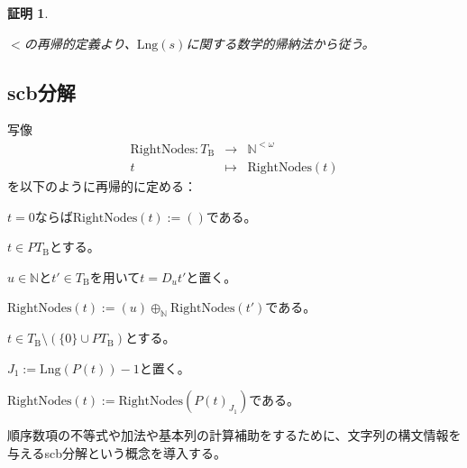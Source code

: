 \documentclass[dvipdfmx,uplatex]{jsarticle}
\theoremstyle{customnonumberbreakfortheorem}
\theoremstyle{customnonumberbreakforproof}
\newtheorem{hideableproof}{証明}
\begin{document}
\begin{hideableproof}
	\begin{indented}
		\item \(<\)の再帰的定義より、\(\textrm{Lng}(s)\)に関する数学的帰納法から従う。
	\end{indented}
\end{hideableproof}


\subsection{scb分解}

写像
\begin{eqnarray*}
\textrm{RightNodes} \colon T_{\textrm{B}} & \to & \mathbb{N}^{< \omega} \\
t & \mapsto & \textrm{RightNodes}(t)
\end{eqnarray*}
を以下のように再帰的に定める：
\begin{nenumerate}
	\item \(t = 0\)ならば\(\textrm{RightNodes}(t) := ()\)である。
	\item \(t \in PT_{\textrm{B}}\)とする。
	\begin{nenumerate}
		\item \(u \in \mathbb{N}\)と\(t' \in T_{\textrm{B}}\)を用いて\(t = D_u t'\)と置く。
		\item \(\textrm{RightNodes}(t) := (u) \oplus_{\mathbb{N}} \textrm{RightNodes}(t')\)である。
	\end{nenumerate}
	\item \(t \in T_{\textrm{B}} \setminus (\{0\} \cup PT_{\textrm{B}})\)とする。
	\begin{nenumerate}
		\item \(J_1 := \textrm{Lng}(P(t)) - 1\)と置く。
		\item \(\textrm{RightNodes}(t) := \textrm{RightNodes}(P(t)_{J_1})\)である。
	\end{nenumerate}
\end{nenumerate}

順序数項の不等式や加法や基本列の計算補助をするために、文字列の構文情報を与えるscb分解という概念を導入する。
\end{document}
